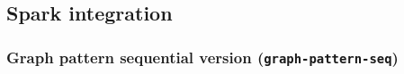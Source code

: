 \subsection{Spark integration}\label{subsec:spark-integration}




\subsubsection{Graph pattern sequential version (\texttt{graph-pattern-seq})}
